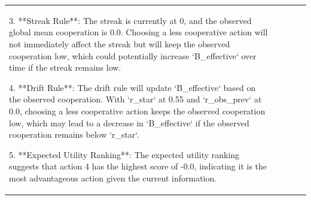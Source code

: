 \begin{tabular}{lp{8cm}ll l}
3. **Streak Rule**: The streak is currently at 0, and the observed global mean cooperation is 0.0. Choosing a less cooperative action will not immediately affect the streak but will keep the observed cooperation low, which could potentially increase `B\_effective` over time if the streak remains low.

4. **Drift Rule**: The drift rule will update `B\_effective` based on the observed cooperation. With `r\_star` at 0.55 and `r\_obs\_prev` at 0.0, choosing a less cooperative action keeps the observed cooperation low, which may lead to a decrease in `B\_effective` if the observed cooperation remains below `r\_star`.

5. **Expected Utility Ranking**: The expected utility ranking suggests that action 4 has the highest score of -0.0, indicating it is the most advantageous action given the current information.


\end{tabular}
